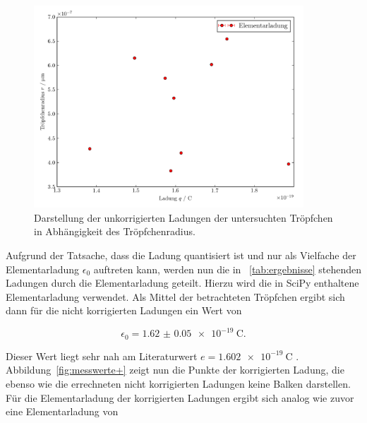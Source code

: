 \documentclass[
  bibliography=totoc,     %
  captions=tableheading,  %
  titlepage=firstiscover, %
]{scrartcl}
\begin{document}
\begin{figure}[h]
    \centering
    \includegraphics[width=0.9\textwidth]{plot_messwerte.pdf}
    \caption{Darstellung der unkorrigierten Ladungen der untersuchten Tröpfchen in Abhängigkeit des Tröpfchenradius.}
    \label{fig:messwerte}
\end{figure}

Aufgrund der Tatsache, dass die Ladung quantisiert ist und nur als Vielfache der Elementarladung $\epsilon_0$ auftreten kann, werden nun die in ~\ref{tab:ergebnisse} stehenden Ladungen durch die Elementarladung geteilt. Hierzu wird die in SciPy enthaltene Elementarladung verwendet. Als Mittel der betrachteten Tröpfchen ergibt sich dann für die nicht korrigierten Ladungen ein Wert von

\begin{equation}
    \epsilon_0 = \SI{1.62(5)e-19}{\coulomb}.
\end{equation}

Dieser Wert liegt sehr nah am Literaturwert $e = \SI{1.602e-19}{\coulomb}$ \cite{Elementarladung}. Abbildung~\ref{fig:messwerte+} zeigt nun die Punkte der korrigierten Ladung, die ebenso wie die errechneten nicht korrigierten Ladungen keine Balken darstellen. Für die Elementarladung der korrigierten Ladungen ergibt sich analog wie zuvor eine Elementarladung von
\end{document}
